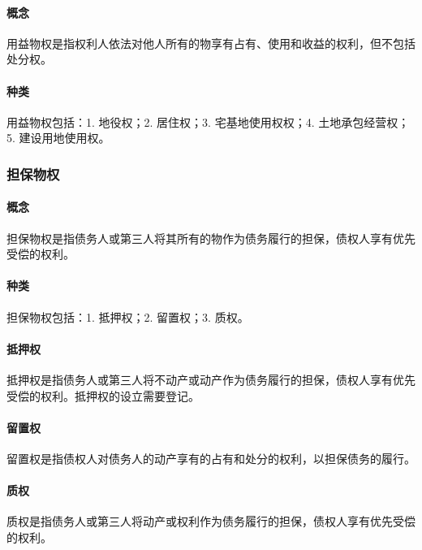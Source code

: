 \paragraph{概念} 用益物权是指权利人依法对他人所有的物享有占有、使用和收益的权利，但不包括处分权。

\paragraph{种类} 用益物权包括：1. 地役权；2. 居住权；3. 宅基地使用权权；4. 土地承包经营权；5. 建设用地使用权。

\subsubsection{担保物权}

\paragraph{概念} 担保物权是指债务人或第三人将其所有的物作为债务履行的担保，债权人享有优先受偿的权利。

\paragraph{种类} 担保物权包括：1. 抵押权；2. 留置权；3. 质权。

\paragraph{抵押权} 抵押权是指债务人或第三人将不动产或动产作为债务履行的担保，债权人享有优先受偿的权利。抵押权的设立需要登记。

\paragraph{留置权} 留置权是指债权人对债务人的动产享有的占有和处分的权利，以担保债务的履行。

\paragraph{质权} 质权是指债务人或第三人将动产或权利作为债务履行的担保，债权人享有优先受偿的权利。
